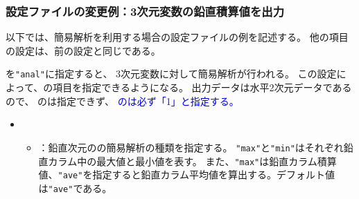 \subsubsection{設定ファイルの変更例：3次元変数の鉛直積算値を出力}
以下では、簡易解析を利用する場合の設定ファイルの例を記述する。
他の項目の設定は、前の設定と同じである。

を\verb|"anal"|に指定すると、
3次元変数に対して簡易解析が行われる。
この設定によって、の項目を指定できるようになる。
出力データは水平2次元データであるので、
のは指定できず、
\textcolor{blue}{のは必ず「1」と指定する。}

\begin{itemize}
 \item {}
 \begin{itemize}
  \item {}：鉛直次元のの簡易解析の種類を指定する。
  \verb|"max"|と\verb|"min"|はそれぞれ鉛直カラム中の最大値と最小値を表す。
  また、\verb|"max"|は鉛直カラム積算値、\verb|"ave"|を指定すると鉛直カラム平均値を算出する。デフォルト値は\verb|"ave"|である。
 \end{itemize}
\end{itemize}

